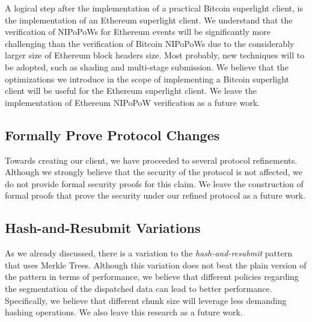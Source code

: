 A logical step after the implementation of a practical Bitcoin superlight
client, is the implementation of an Ethereum superlight client. We understand
that the verification of NIPoPoWs for Ethereum events will be significantly
more challenging than the verification of Bitcoin NIPoPoWs due to the
considerably larger size of Ethereum block headers size. Most probably, new
techniques will to be adopted, such as shading and multi-stage submission.  We
believe that the optimizations we introduce in the scope of implementing a
Bitcoin superlight client will be useful for the Ethereum superlight client. We
leave the implementation of Ethereum NIPoPoW verification as a future work.

\subsection{Formally Prove Protocol Changes}

Towards creating our client, we have proceeded to several protocol refinements.
Although we strongly believe that the security of the protocol is not affected,
we do not provide formal security proofs for this claim. We leave the
construction of formal proofs that prove the security under our refined
protocol as a future work.

\subsection{Hash-and-Resubmit Variations}

As we already discussed, there is a variation to the \emph{hash-and-resubmit}
pattern that uses Merkle Trees. Although this variation does not beat the plain
version of the pattern in terms of performance, we believe that different
policies regarding the segmentation of the dispatched data can lead to better
performance. Specifically, we believe that different chunk size will leverage
less demanding hashing operations. We also leave this research as a future
work.
